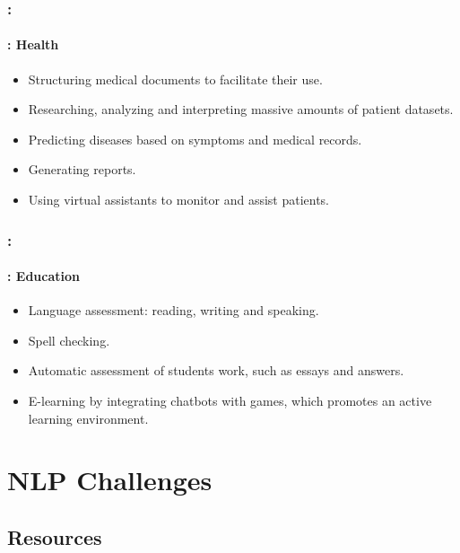 \documentclass[xcolor=table]{beamer}
\begin{document}
\begin{frame}
	\frametitle{\insertshortsubtitle: \insertsection}
	\framesubtitle{\insertsubsection: Health}

	\begin{itemize}
		\item Structuring medical documents to facilitate their use.
		\item Researching, analyzing and interpreting massive amounts of patient datasets.
		\item Predicting diseases based on symptoms and medical records.
		\item Generating reports.
		\item Using virtual assistants to monitor and assist patients.
	\end{itemize}

\end{frame}

\begin{frame}
	\frametitle{\insertshortsubtitle: \insertsection}
	\framesubtitle{\insertsubsection: Education}

	\begin{itemize}
		\item Language assessment: reading, writing and speaking.
		\item Spell checking.
		\item Automatic assessment of students work, such as essays and answers.
		\item E-learning by integrating chatbots with games, which promotes an active learning environment.
	\end{itemize}

\end{frame}

\section{NLP Challenges}

\begin{frame}
	\frametitle{\insertshortsubtitle}
	\framesubtitle{\insertsection}
	
	
\end{frame}

\subsection{Resources}
\end{document}
